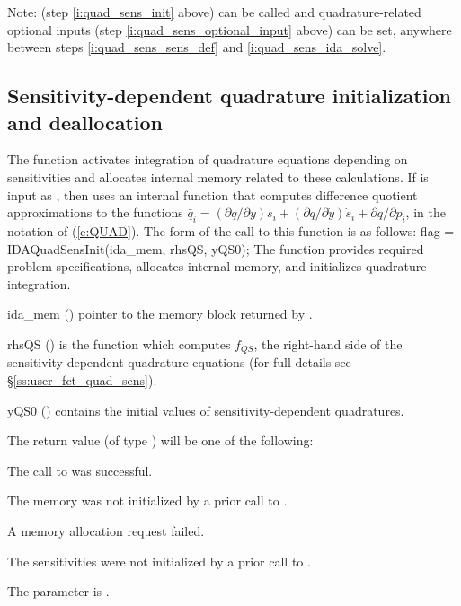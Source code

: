 Note:  (step \ref{i:quad_sens_init} above) can be called and
quadrature-related optional inputs (step \ref{i:quad_sens_optional_input} above)
can be set, anywhere between steps \ref{i:quad_sens_sens_def} and
\ref{i:quad_sens_ida_solve}.


\subsection{Sensitivity-dependent quadrature initialization and deallocation}
\label{ss:quad_sens_init}

The function  activates integration of quadrature equations depending
on sensitivities and allocates internal memory related to these calculations.
If  is input as , then {\idas} uses an internal function that
computes difference quotient approximations to the functions
$\bar q_i = (\partial q / \partial y) s_i + (\partial q / \partial \dot{y}) \dot{s}_i +
 \partial q / \partial p_i$, in the notation of (\ref{e:QUAD}).
The form of the call to this function is as follows:
{
flag = IDAQuadSensInit(ida\_mem, rhsQS, yQS0);
}
{
  The function  provides required problem specifications,
  allocates internal memory, and initializes quadrature integration.
}
{
  \begin{args}
  \item[ida\_mem] ()
    pointer to the {\idas} memory block returned by .
  \item[rhsQS] ()
    is the {\CC} function which computes $f_{QS}$, the right-hand side of the 
    sensitivity-dependent quadrature equations
    (for full details see \S\ref{ss:user_fct_quad_sens}).
  \item[yQS0] ()
    contains the initial values of sensitivity-dependent quadratures.
  \end{args}
}
{
  The return value  (of type ) will be one of the following:
  \begin{args}
  \item[\Id{IDA\_SUCCESS}]
    The call to  was successful.
  \item[\Id{IDA\_MEM\_NULL}] 
    The {\idas} memory was not initialized by a prior call to .
  \item[\Id{IDA\_MEM\_FAIL}] 
    A memory allocation request failed.
  \item[\Id{IDA\_NO\_SENS}] 
    The sensitivities were not initialized by a prior call to .
  \item[\Id{IDA\_ILL\_INPUT}]
    The parameter  is .
  \end{args}
}
